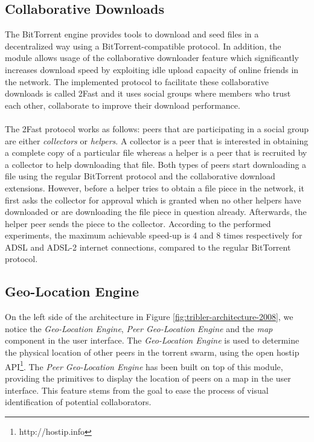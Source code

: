 \subsection{Collaborative Downloads}
The BitTorrent engine provides tools to download and seed files in a decentralized way using a BitTorrent-compatible protocol. In addition, the module allows usage of the collaborative downloader feature which significantly increases download speed by exploiting idle upload capacity of online friends in the network. The implemented protocol to facilitate these collaborative downloads is called 2Fast and it uses social groups where members who trust each other, collaborate to improve their download performance.\\\\
The 2Fast protocol works as follows: peers that are participating in a social group are either \emph{collectors} or \emph{helpers}. A collector is a peer that is interested in obtaining a complete copy of a particular file whereas a helper is a peer that is recruited by a collector to help downloading that file. Both types of peers start downloading a file using the regular BitTorrent protocol and the collaborative download extensions. However, before a helper tries to obtain a file piece in the network, it first asks the collector for approval which is granted when no other helpers have downloaded or are downloading the file piece in question already. Afterwards, the helper peer sends the piece to the collector. According to the performed experiments, the maximum achievable speed-up is 4 and 8 times respectively for ADSL and ADSL-2 internet connections, compared to the regular BitTorrent protocol.

\subsection{Geo-Location Engine}
On the left side of the architecture in Figure \ref{fig:tribler-architecture-2008}, we notice the \emph{Geo-Location Engine}, \emph{Peer Geo-Location Engine} and the \emph{map} component in the user interface. The \emph{Geo-Location Engine} is used to determine the physical location of other peers in the torrent swarm, using the open hostip API\footnote{http://hostip.info}. The \emph{Peer Geo-Location Engine} has been built on top of this module, providing the primitives to display the location of peers on a map in the user interface. This feature stems from the goal to ease the process of visual identification of potential collaborators.

